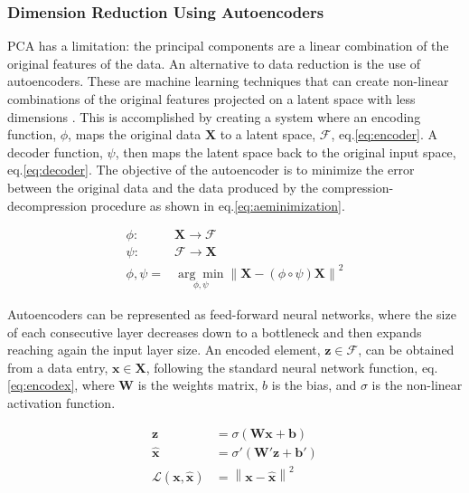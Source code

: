 \subsubsection{Dimension Reduction Using Autoencoders}
PCA has a limitation: the principal components are a linear combination of the original features of the data. An alternative to data reduction is the use of autoencoders. These are machine learning techniques that can create non-linear combinations of the original features projected on a latent space with less dimensions \citep{Hinton2006}. This is accomplished by creating a system where an encoding function, $\phi$, maps the original data $\boldsymbol{X}$ to a latent space, $\boldsymbol{\mathcal{F}}$, eq.\eqref{eq:encoder}. A decoder function, $\psi$, then maps the latent space back to the original input space, eq.\eqref{eq:decoder}. The objective of the autoencoder is to minimize the error between the original data and the data produced by the compression-decompression procedure as shown in eq.\eqref{eq:aeminimization}.

\begin{align}
\phi: & \boldsymbol{X} \rightarrow \boldsymbol{\mathcal{F}} \label{eq:encoder}\\
\psi: & \boldsymbol{\mathcal{F}} \rightarrow \boldsymbol{X} \label{eq:decoder} \\
\phi,\psi = & \underset{\phi,\psi}{\arg \min} \left\lVert \boldsymbol{X} - (\phi \circ \psi) \boldsymbol{X} \right\rVert^2 \label{eq:aeminimization}
\end{align}

Autoencoders can be represented as feed-forward neural networks, where the size of each consecutive layer decreases down to a bottleneck and then expands reaching again the input layer size. An encoded element, $\boldsymbol{z} \in \boldsymbol{\mathcal{F}}$, can be obtained from a data entry, $\boldsymbol{x} \in \boldsymbol{X}$, following the standard neural network function, eq.\eqref{eq:encodex}, where $\boldsymbol{W}$ is the weights matrix, $b$ is the bias, and $\sigma$ is the non-linear activation function.

\begin{align}
\boldsymbol{z} & = \sigma \left( \boldsymbol{W}\boldsymbol{x} + \boldsymbol{b} \right) \label{eq:encodex} \\
\boldsymbol{\hat{x}} & = \sigma' \left( \boldsymbol{W'}\boldsymbol{z} + \boldsymbol{b'} \right) \label{eq:decodez} \\ 
\mathcal{L}(\boldsymbol{x}, \boldsymbol{\hat{x}}) & =  \left\lVert \boldsymbol{x}- \boldsymbol{\hat{x}} \right\rVert^2 \label{eq:aeloss}
\end{align}

